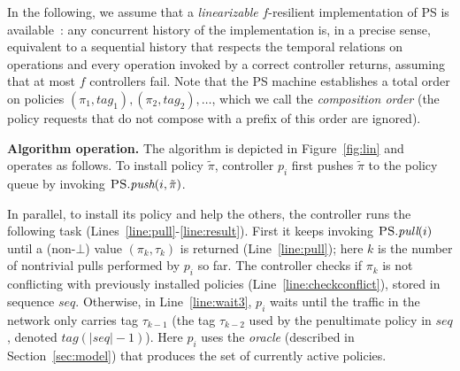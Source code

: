 \documentclass[11pt,pdftex,letter]{article}
\newcommand{\PS}{\textsc{PS}}
\newcommand{\seq}{\textit{seq}}
\newcommand{\Tag}{\textit{tag}}
\newcommand{\ie}{{\it i.e.}}
\begin{document}
\vspace{2mm}
\noindent
In the following, we assume that a \emph{linearizable} $f$-resilient
implementation of  {\PS} is available~\cite{HW90}: any concurrent history of
the implementation is, in a precise sense, equivalent to a
sequential history that respects the temporal relations on operations
and every operation invoked by a correct controller returns, assuming
that at most $f$ controllers fail.
Note that the {\PS} machine establishes a total order on %
policies $(\pi_1,\textit{tag}_1), (\pi_2,\textit{tag}_2),\ldots$,
which we call the \emph{composition order} (the policy requests that
do not compose with a prefix of this order are ignored).

\vspace{1mm}
\noindent
\textbf{Algorithm operation.}
The algorithm is depicted in Figure~\ref{fig:lin} and operates as follows.
To install policy $\tilde \pi$, controller $p_i$ first
pushes $\tilde \pi$ to the policy queue by invoking ${\PS}.\textit{push}(i,\tilde\pi)$.

In parallel, to install its policy and help the others, the controller runs the
following task (Lines~\ref{line:pull}-\ref{line:result}).
First it keeps invoking  ${\PS}.\textit{pull}(i)$ until a
(non-$\bot$) value $(\pi_k,\tau_k)$ is returned (Line~\ref{line:pull}); here $k$ is the number
of nontrivial pulls performed by $p_i$ so far.
The controller checks if $\pi_k$
is not conflicting with previously installed policies (Line~\ref{line:checkconflict}), stored in
sequence $\textit{seq}$.
Otherwise, in Line~\ref{line:wait3}, $p_i$ waits until the traffic in the network only
carries tag $\tau_{k-1}$ (the tag $\tau_{k-2}$ used by the penultimate policy in $\seq$,
denoted $\Tag(|\seq|-1)$).
Here $p_i$ uses the \emph{oracle} (described in
Section~\ref{sec:model}) that produces the set of
currently active policies.
\end{document}
